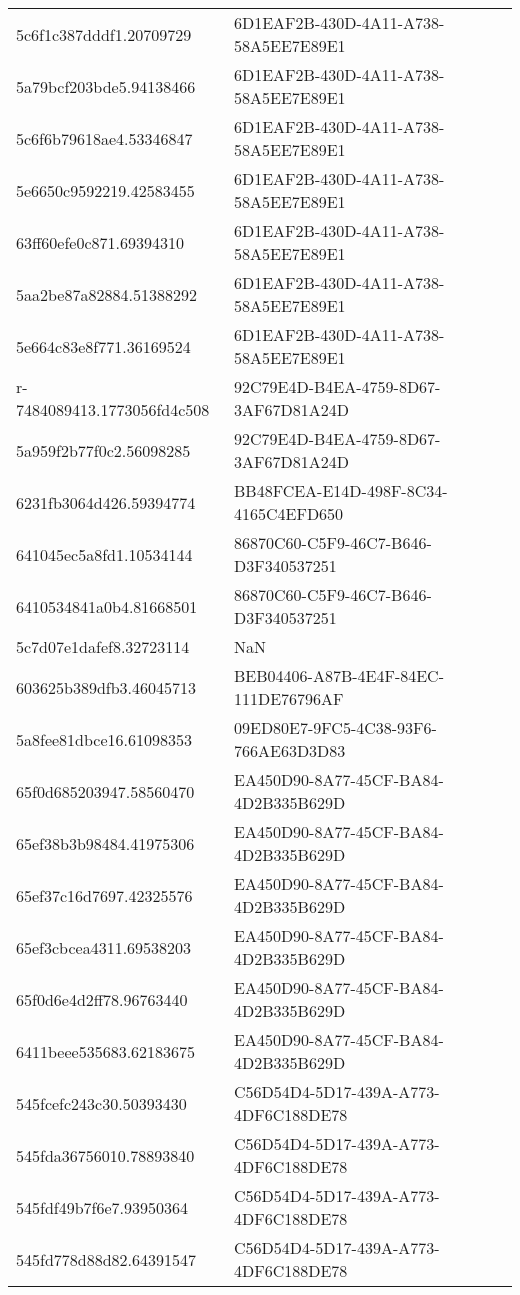 \begin{tabular}{ll}
5c6f1c387dddf1.20709729 & 6D1EAF2B-430D-4A11-A738-58A5EE7E89E1 \\
5a79bcf203bde5.94138466 & 6D1EAF2B-430D-4A11-A738-58A5EE7E89E1 \\
5c6f6b79618ae4.53346847 & 6D1EAF2B-430D-4A11-A738-58A5EE7E89E1 \\
5e6650c9592219.42583455 & 6D1EAF2B-430D-4A11-A738-58A5EE7E89E1 \\
63ff60efe0c871.69394310 & 6D1EAF2B-430D-4A11-A738-58A5EE7E89E1 \\
5aa2be87a82884.51388292 & 6D1EAF2B-430D-4A11-A738-58A5EE7E89E1 \\
5e664c83e8f771.36169524 & 6D1EAF2B-430D-4A11-A738-58A5EE7E89E1 \\
r-7484089413.1773056fd4c508 & 92C79E4D-B4EA-4759-8D67-3AF67D81A24D \\
5a959f2b77f0c2.56098285 & 92C79E4D-B4EA-4759-8D67-3AF67D81A24D \\
6231fb3064d426.59394774 & BB48FCEA-E14D-498F-8C34-4165C4EFD650 \\
641045ec5a8fd1.10534144 & 86870C60-C5F9-46C7-B646-D3F340537251 \\
6410534841a0b4.81668501 & 86870C60-C5F9-46C7-B646-D3F340537251 \\
5c7d07e1dafef8.32723114 & NaN \\
603625b389dfb3.46045713 & BEB04406-A87B-4E4F-84EC-111DE76796AF \\
5a8fee81dbce16.61098353 & 09ED80E7-9FC5-4C38-93F6-766AE63D3D83 \\
65f0d685203947.58560470 & EA450D90-8A77-45CF-BA84-4D2B335B629D \\
65ef38b3b98484.41975306 & EA450D90-8A77-45CF-BA84-4D2B335B629D \\
65ef37c16d7697.42325576 & EA450D90-8A77-45CF-BA84-4D2B335B629D \\
65ef3cbcea4311.69538203 & EA450D90-8A77-45CF-BA84-4D2B335B629D \\
65f0d6e4d2ff78.96763440 & EA450D90-8A77-45CF-BA84-4D2B335B629D \\
6411beee535683.62183675 & EA450D90-8A77-45CF-BA84-4D2B335B629D \\
545fcefc243c30.50393430 & C56D54D4-5D17-439A-A773-4DF6C188DE78 \\
545fda36756010.78893840 & C56D54D4-5D17-439A-A773-4DF6C188DE78 \\
545fdf49b7f6e7.93950364 & C56D54D4-5D17-439A-A773-4DF6C188DE78 \\
545fd778d88d82.64391547 & C56D54D4-5D17-439A-A773-4DF6C188DE78 \\

\end{tabular}

